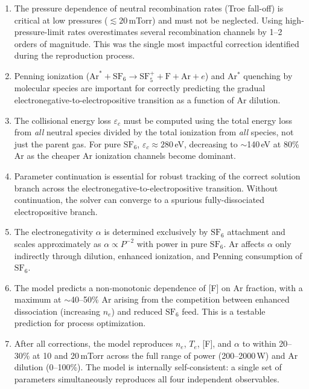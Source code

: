 \documentclass[11pt,a4paper]{article}
\newcommand{\SFsix}{\mathrm{SF}_6}
\newcommand{\SFfive}{\mathrm{SF}_5}
\newcommand{\Ar}{\mathrm{Ar}}
\newcommand{\Te}{T_e}
\newcommand{\ne}{n_e}
\begin{document}
\begin{enumerate}
\item The pressure dependence of neutral recombination rates (Troe fall-off) is critical at low pressures ($\lesssim 20$\,mTorr) and must not be neglected.  Using high-pressure-limit rates overestimates several recombination channels by 1--2 orders of magnitude.  This was the single most impactful correction identified during the reproduction process.

\item Penning ionization ($\Ar^* + \SFsix \to \SFfive^+ + \mathrm{F} + \Ar + e$) and Ar$^*$ quenching by molecular species are important for correctly predicting the gradual electronegative-to-electropositive transition as a function of Ar dilution.

\item The collisional energy loss $\varepsilon_c$ must be computed using the total energy loss from \emph{all} neutral species divided by the total ionization from \emph{all} species, not just the parent gas.  For pure $\SFsix$, $\varepsilon_c \approx 280$\,eV, decreasing to $\sim$140\,eV at 80\% Ar as the cheaper Ar ionization channels become dominant.

\item Parameter continuation is essential for robust tracking of the correct solution branch across the electronegative-to-electropositive transition.  Without continuation, the solver can converge to a spurious fully-dissociated electropositive branch.

\item The electronegativity $\alpha$ is determined exclusively by $\SFsix$ attachment and scales approximately as $\alpha \propto P^{-2}$ with power in pure $\SFsix$.  Ar affects $\alpha$ only indirectly through dilution, enhanced ionization, and Penning consumption of $\SFsix$.

\item The model predicts a non-monotonic dependence of [F] on Ar fraction, with a maximum at $\sim$40--50\% Ar arising from the competition between enhanced dissociation (increasing $\ne$) and reduced $\SFsix$ feed.  This is a testable prediction for process optimization.

\item After all corrections, the model reproduces $\ne$, $\Te$, [F], and $\alpha$ to within 20--30\% at 10 and 20\,mTorr across the full range of power (200--2000\,W) and Ar dilution (0--100\%).  The model is internally self-consistent: a single set of parameters simultaneously reproduces all four independent observables.
\end{enumerate}
\end{document}
